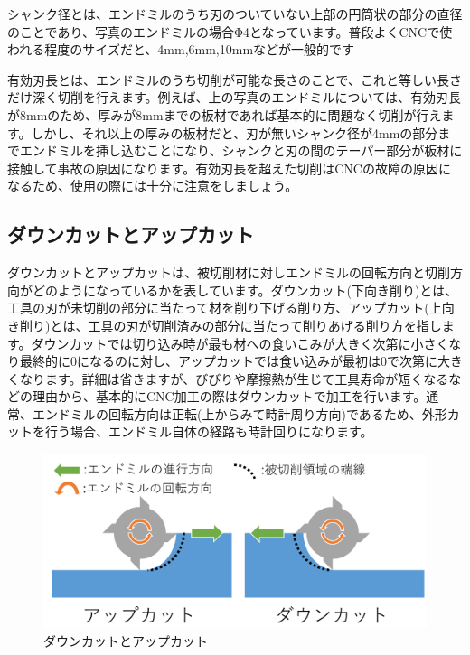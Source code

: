 \documentclass[b5paper, 9pt, twocolumn, titlepage,openany]{jsbook}%
\begin{document}
シャンク径とは、エンドミルのうち刃のついていない上部の円筒状の部分の直径のことであり、写真のエンドミルの場合Φ4となっています。普段よくCNCで使われる程度のサイズだと、4mm,6mm,10mmなどが一般的です

有効刃長とは、エンドミルのうち切削が可能な長さのことで、これと等しい長さだけ深く切削を行えます。例えば、上の写真のエンドミルについては、有効刃長が8mmのため、厚みが8mmまでの板材であれば基本的に問題なく切削が行えます。しかし、それ以上の厚みの板材だと、刃が無いシャンク径が4mmの部分までエンドミルを挿し込むことになり、シャンクと刃の間のテーパー部分が板材に接触して事故の原因になります。有効刃長を超えた切削はCNCの故障の原因になるため、使用の際には十分に注意をしましょう。\\

\subsection{ダウンカットとアップカット}

ダウンカットとアップカットは、被切削材に対しエンドミルの回転方向と切削方向がどのようになっているかを表しています。ダウンカット(下向き削り)とは、工具の刃が未切削の部分に当たって材を削り下げる削り方、アップカット(上向き削り)とは、工具の刃が切削済みの部分に当たって削りあげる削り方を指します。ダウンカットでは切り込み時が最も材への食いこみが大きく次第に小さくなり最終的に0になるのに対し、アップカットでは食い込みが最初は0で次第に大きくなります。詳細は省きますが、びびりや摩擦熱が生じて工具寿命が短くなるなどの理由から、基本的にCNC加工の際はダウンカットで加工を行います。通常、エンドミルの回転方向は正転(上からみて時計周り方向)であるため、外形カットを行う場合、エンドミル自体の経路も時計回りになります。\\

\begin{figure}[tbh]
  \begin{center}
    \begin{minipage}{1.0\columnwidth}
      \includegraphics[width=\columnwidth]{cutting.png}
      \caption{ダウンカットとアップカット    \label{cutting}}
    \end{minipage}
  \end{center}
\end{figure}
\end{document}
